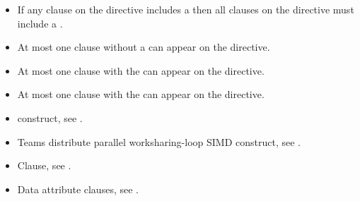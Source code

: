 \begin{itemize}
\item If any  clause on the directive includes a
       then all  clauses
      on the directive must include a .

\item At most one  clause without a
       can appear on the directive.

\item At most one  clause with the 
       can appear on the directive.

\item At most one  clause with the 
       can appear on the directive.
\end{itemize}

\crossreferences
\begin{itemize}
\item {} construct, see .

\item Teams distribute parallel worksharing-loop SIMD construct, see
      .

\item {} Clause, see .

\item Data attribute clauses, see
      .
\end{itemize}
